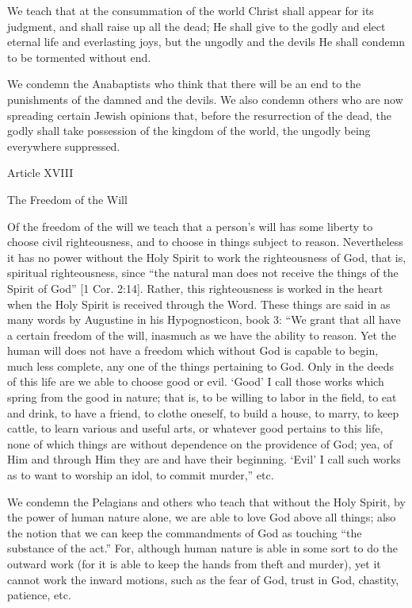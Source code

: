 We teach that at the consummation of the world Christ shall appear for its judgment, and shall raise up all the dead; He shall give to the godly and elect eternal life and everlasting joys, but the ungodly and the devils He shall condemn to be tormented without end.

We condemn the Anabaptists who think that there will be an end to the punishments of the damned and the devils. We also condemn others who are now spreading certain Jewish opinions that, before the resurrection of the dead, the godly shall take possession of the kingdom of the world, the ungodly being everywhere suppressed.

 

Article XVIII

The Freedom of the Will

Of the freedom of the will we teach that a person’s will has some liberty to choose civil righteousness, and to choose in things subject to reason. Nevertheless it has no power without the Holy Spirit to work the righteousness of God, that is, spiritual righteousness, since “the natural man does not receive the things of the Spirit of God” [1 Cor. 2:14]. Rather, this righteousness is worked in the heart when the Holy Spirit is received through the Word. These things are said in as many words by Augustine in his Hypognosticon, book 3: “We grant that all have a certain freedom of the will, inasmuch as we have the ability to reason. Yet the human will does not have a freedom which without God is capable to begin, much less complete, any one of the things pertaining to God. Only in the deeds of this life are we able to choose good or evil. ‘Good’ I call those works which spring from the good in nature; that is, to be willing to labor in the field, to eat and drink, to have a friend, to clothe oneself, to build a house, to marry, to keep cattle, to learn various and useful arts, or whatever good pertains to this life, none of which things are without dependence on the providence of God; yea, of Him and through Him they are and have their beginning. ‘Evil’ I call such works as to want to worship an idol, to commit murder,” etc.

We condemn the Pelagians and others who teach that without the Holy Spirit, by the power of human nature alone, we are able to love God above all things; also the notion that we can keep the commandments of God as touching “the substance of the act.” For, although human nature is able in some sort to do the outward work (for it is able to keep the hands from theft and murder), yet it cannot work the inward motions, such as the fear of God, trust in God, chastity, patience, etc.

